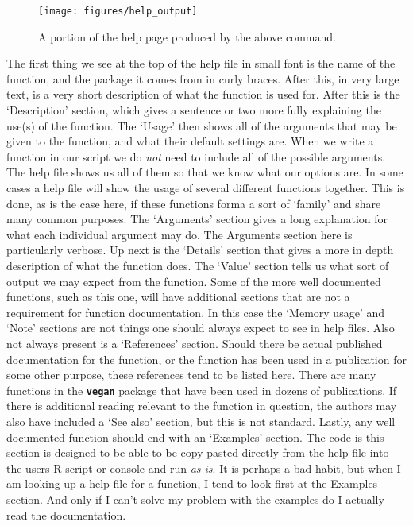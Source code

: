 \documentclass[
]{book}
\begin{document}
\begin{figure}

{\centering \texttt{[image: figures/help\_output]} 

}

\caption{A portion of the help page produced by the above command.}\label{fig:help-output}
\end{figure}

The first thing we see at the top of the help file in small font is the name of the function, and the package it comes from in curly braces. After this, in very large text, is a very short description of what the function is used for. After this is the `Description' section, which gives a sentence or two more fully explaining the use(s) of the function. The `Usage' then shows all of the arguments that may be given to the function, and what their default settings are. When we write a function in our script we do \emph{not} need to include all of the possible arguments. The help file shows us all of them so that we know what our options are. In some cases a help file will show the usage of several different functions together. This is done, as is the case here, if these functions forma a sort of `family' and share many common purposes. The `Arguments' section gives a long explanation for what each individual argument may do. The Arguments section here is particularly verbose. Up next is the `Details' section that gives a more in depth description of what the function does. The `Value' section tells us what sort of output we may expect from the function. Some of the more well documented functions, such as this one, will have additional sections that are not a requirement for function documentation. In this case the `Memory usage' and `Note' sections are not things one should always expect to see in help files. Also not always present is a `References' section. Should there be actual published documentation for the function, or the function has been used in a publication for some other purpose, these references tend to be listed here. There are many functions in the \textbf{\texttt{vegan}} package that have been used in dozens of publications. If there is additional reading relevant to the function in question, the authors may also have included a `See also' section, but this is not standard. Lastly, any well documented function should end with an `Examples' section. The code is this section is designed to be able to be copy-pasted directly from the help file into the users R script or console and run \emph{as is}. It is perhaps a bad habit, but when I am looking up a help file for a function, I tend to look first at the Examples section. And only if I can't solve my problem with the examples do I actually read the documentation.
\end{document}
